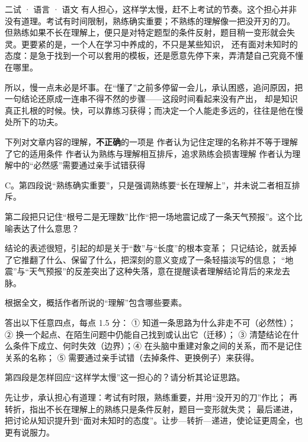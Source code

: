 \documentclass[cjk=noto, seal=first]{mojing-exam}
\begin{document}
\begin{paper}[time={建议 2 小时（训练设置）}, full=100]{二试 · 语言 · 语文}
\hspace{2em}有人担心，这样学太慢，赶不上考试的节奏。这个担心并非没有道理。考试有时间限制，熟练确实重要；不熟练的理解像一把没开刃的刀。
但熟练如果不长在理解上，便只是对特定题型的条件反射，题目稍一变形就会失灵。更要紧的是，一个人在学习中养成的，不只是某些知识，
还有面对未知时的态度：是急于找到一个可以套用的模板，还是愿意先停下来，弄清楚自己究竟不懂在哪里。

\hspace{2em}所以，慢一点未必是坏事。在“懂了”之前多停留一会儿，承认困惑，追问原因，把一句结论还原成一连串不得不然的步骤——这段时间看起来没有产出，
却是知识真正扎根的时候。快，可以靠练习获得；而决定一个人能走多远的，往往是他在慢处所下的功夫。

\begin{questions}
\question[3] 下列对文章内容的理解，\textbf{不正确}的一项是 \paren[C]
        {作者认为记住定理的名称并不等于理解了它的适用条件}
        {作者认为熟练与理解相互排斥，追求熟练会损害理解}
        {作者认为理解中的“必然感”需要通过亲手试错获得}
\begin{solution}
C。第四段说“熟练确实重要”，只是强调熟练要“长在理解上”，并未说二者相互排斥。
\end{solution}

\question[5] 第二段把只记住“根号二是无理数”比作“把一场地震记成了一条天气预报”。这个比喻表达了什么意思？
\answerspace{3cm}
\begin{solution}
结论的表述很短，引起的却是关于“数”与“长度”的根本变革；
只记结论，就丢掉了它推翻了什么、保留了什么，把深刻的意义变成了一条轻描淡写的信息；
“地震”与“天气预报”的反差突出了这种失落，意在提醒读者理解结论背后的来龙去脉。
\end{solution}

\question[6] 根据全文，概括作者所说的“理解”包含哪些要素。
\answerspace{3cm}
\begin{solution}
答出以下任意四点，每点 1.5 分：
① 知道一条思路为什么非走不可（必然性）；② 换一个起点、在陌生问题中仍能自己找到或认出它（迁移）；
③ 清楚结论在什么条件下成立、何时失效（边界）；④ 在头脑中重建对象之间的关系，而不是记住关系的名称；
⑤ 需要通过亲手试错（去掉条件、更换例子）来获得。
\end{solution}

\question[6] 第四段是怎样回应“这样学太慢”这一担心的？请分析其论证思路。
\answerspace{3cm}
\begin{solution}
先让步，承认担心有道理：考试有时限，熟练重要，并用“没开刃的刀”作比；
再转折，指出不长在理解上的熟练只是条件反射，题目一变形就失灵；
最后递进，把讨论从知识提升到“面对未知时的态度”。让步—转折—递进，使论证更周全，也更有说服力。
\end{solution}
\end{questions}


\end{paper}
\end{document}
